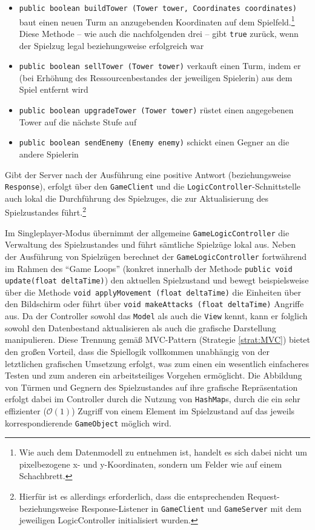 \documentclass[enabledeprecatedfontcommands,fontsize=12pt,paper=a4,twoside,parskip=half]{scrartcl}
\begin{document}
\begin{itemize}
    \item \texttt{public boolean buildTower (Tower tower, Coordinates coordinates)} baut einen neuen Turm an anzugebenden Koordinaten auf dem Spielfeld.\footnote{Wie auch dem Datenmodell zu entnehmen ist, handelt es sich dabei nicht um pixelbezogene x- und y-Koordinaten, sondern um Felder wie auf einem Schachbrett.} Diese Methode -- wie auch die nachfolgenden drei -- gibt \texttt{true} zurück, wenn der Spielzug legal beziehungsweise erfolgreich war

    \item \texttt{public boolean sellTower (Tower tower)} verkauft einen Turm, indem er (bei Erhöhung des Ressourcenbestandes der jeweiligen Spielerin) aus dem Spiel entfernt wird

    \item \texttt{public boolean upgradeTower (Tower tower)} rüstet einen angegebenen Tower auf die nächste Stufe auf
    
    \item \texttt{public boolean sendEnemy (Enemy enemy)} schickt einen Gegner an die andere Spielerin
\end{itemize}

Gibt der Server nach der Ausführung eine positive Antwort (beziehungsweise \texttt{Response}), erfolgt über den \texttt{GameClient} und die \texttt{LogicController}-Schnittstelle auch lokal die Durchführung des Spielzuges, die zur Aktualisierung des Spielzustandes führt.\footnote{Hierfür ist es allerdings erforderlich, dass die entsprechenden Request- beziehungsweise Response-Listener in \texttt{GameClient} und \texttt{GameServer} mit dem jeweiligen LogicController initialisiert wurden.}

Im Singleplayer-Modus übernimmt der allgemeine \texttt{GameLogicController} die Verwaltung des Spielzustandes und führt sämtliche Spielzüge lokal aus. Neben der Ausführung von Spielzügen berechnet der \texttt{GameLogicController} fortwährend im Rahmen des \enquote{Game Loops} (konkret innerhalb der Methode \texttt{public void update(float deltaTime)}) den aktuellen Spielzustand und bewegt beispielsweise über die Methode \texttt{void applyMovement (float deltaTime)} die Einheiten über den Bildschirm oder führt über \texttt{void makeAttacks (float deltaTime)} Angriffe aus. Da der Controller sowohl das \texttt{Model} als auch die \texttt{View} kennt, kann er folglich sowohl den Datenbestand aktualisieren als auch die grafische Darstellung manipulieren. Diese Trennung gemäß MVC-Pattern (Strategie \ref{strat:MVC}) bietet den großen Vorteil, dass die Spiellogik vollkommen unabhängig von der letztlichen grafischen Umsetzung erfolgt, was zum einen ein wesentlich einfacheres Testen und zum anderen ein arbeitsteiliges Vorgehen ermöglicht. Die Abbildung von Türmen und Gegnern des Spielzustandes auf ihre grafische Repräsentation erfolgt dabei im Controller durch die Nutzung von \texttt{HashMap}s, durch die ein sehr effizienter ($\mathcal{O}(1)$) Zugriff von einem Element im Spielzustand auf das jeweils korrespondierende \texttt{GameObject} möglich wird.
\end{document}
